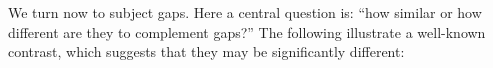 \documentclass[output=paper
,notxmath 
 	        ,biblatex
                ,babelshorthands
                ,newtxmath
                ,draftmode
                ,colorlinks, citecolor=brown
]{langscibook}
\begin{document}



We\label{udc:page-subject-gaps-start} turn now to subject gaps. Here a central question is: ``how similar or
how different are they to complement gaps?'' The following illustrate a
well-known contrast, which suggests that they may be significantly
different:

\begin{exe} \ex \begin{xlist} \label{ex:UDC:25}

\end{xlist}
\end{exe}

\begin{exe} \ex \begin{xlist} \label{ex:UDC:26}

\end{xlist}
\end{exe}
\end{document}
